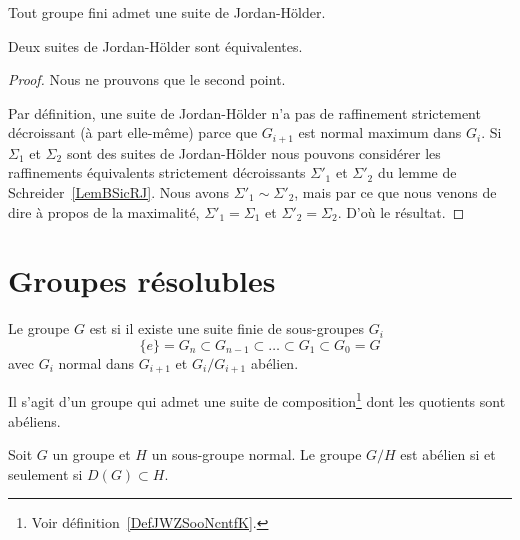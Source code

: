 \begin{theorem}\label{ThoLgxWIC}
    Tout groupe fini admet une suite de Jordan-Hölder.

    Deux suites de Jordan-Hölder sont équivalentes.
\end{theorem}

\begin{proof}
    Nous ne prouvons que le second point.

    Par définition, une suite de Jordan-Hölder n'a pas de raffinement strictement décroissant (à part elle-même) parce que \( G_{i+1}\) est normal maximum dans \( G_i\). Si \( \Sigma_1\) et \( \Sigma_2\) sont des suites de Jordan-Hölder nous pouvons considérer les raffinements équivalents strictement décroissants \( \Sigma'_1\) et \( \Sigma'_2\) du lemme de Schreider~\ref{LemBSicRJ}. Nous avons \( \Sigma'_1\sim\Sigma'_2\), mais par ce que nous venons de dire à propos de la maximalité, \( \Sigma'_1=\Sigma_1\) et \( \Sigma'_2=\Sigma_2\). D'où le résultat.
\end{proof}

\section{Groupes résolubles}

\begin{definition}  \label{DefOSYNooTROIKs}
    Le groupe \( G\) est  si il existe une suite finie de sous-groupes \( G_i\)
    \begin{equation}
        \{ e \}=G_n\subset G_{n-1}\subset\ldots\subset G_1\subset G_0=G
    \end{equation}
    avec \( G_i\) normal dans \( G_{i+1}\) et \( G_i/G_{i+1}\) abélien.
\end{definition}
Il s'agit d'un groupe qui admet une suite de composition\footnote{Voir définition~\ref{DefJWZSooNcntfK}.} dont les quotients sont abéliens.

\begin{lemma}   \label{LemOARMooYhYmbH}
    Soit \( G\) un groupe et \( H\) un sous-groupe normal. Le groupe \( G/H\) est abélien si et seulement si \( D(G)\subset H\).
\end{lemma}

